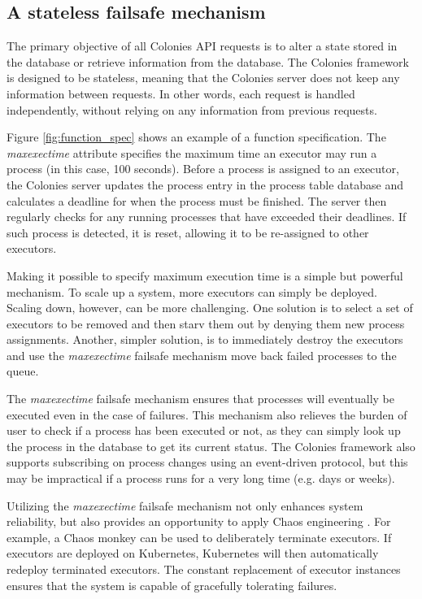 \documentclass{article}
\begin{document}
\subsection{A stateless failsafe mechanism}
The primary objective of all Colonies API requests is to alter a state stored in the database or retrieve information from the database. The Colonies framework is designed to be stateless, meaning that the Colonies server does not keep any information between requests. In other words, each request is handled independently, without relying on any information from previous requests. 

Figure \ref{fig:function_spec} shows an example of a function specification. The \emph{maxexectime} attribute specifies the maximum time an executor may run a process (in this case, 100 seconds). Before a process is assigned to an executor, the Colonies server updates the process entry in the process table database and calculates a deadline for when the process must be finished. The server then regularly checks for any running processes that have exceeded their deadlines. If such process is detected, it is reset, allowing it to be re-assigned to other executors. 

Making it possible to specify maximum execution time is a simple but powerful mechanism. To scale up a system, more executors can simply be deployed. Scaling down, however, can be more challenging. One solution is to select a set of executors to be removed and then starv them out by denying them new process assignments. Another, simpler solution, is to immediately destroy the executors and use the \emph{maxexectime} failsafe mechanism move back failed processes to the queue.  

The \emph{maxexectime} failsafe mechanism ensures that processes will eventually be executed even in the case of failures. This mechanism also relieves the burden of user to check if a process has been executed or not, as they can simply look up the process in the database to get its current status. The Colonies framework also supports subscribing on process changes using an event-driven protocol, but this may be impractical if a process runs for a very long time (e.g. days or weeks).

Utilizing the \emph{maxexectime} failsafe mechanism not only enhances system reliability, but also provides an opportunity to apply Chaos engineering \cite{chaos_engineering}. For example, a Chaos monkey can be used to deliberately terminate executors. If executors are deployed on Kubernetes, Kubernetes will then automatically redeploy terminated executors. The constant replacement of executor instances ensures that the system is capable of gracefully tolerating failures.
\end{document}
